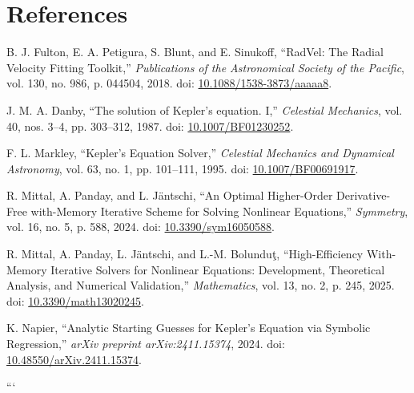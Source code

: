 \documentclass[11pt,a4paper]{article}
\newcommand{\dividerline}{\vspace{0.2em}{\color{Rule}\hrule height 0.5pt}\vspace{0.6em}}
\begin{document}
\vspace{1.4em}
\dividerline

\section*{References}
\begingroup
\small
\begin{enumerate}[label={[\arabic*]}, leftmargin=2.2em, itemsep=0.7em]

  \item B. J. Fulton, E. A. Petigura, S. Blunt, and E. Sinukoff,
  ``RadVel: The Radial Velocity Fitting Toolkit,''
  \textit{Publications of the Astronomical Society of the Pacific},
  vol. 130, no. 986, p. 044504, 2018.
  doi: \href{https://doi.org/10.1088/1538-3873/aaaaa8}
  {10.1088/1538-3873/aaaaa8}.

  \item J. M. A. Danby,
  ``The solution of Kepler's equation. I,''
  \textit{Celestial Mechanics},
  vol. 40, nos. 3--4, pp. 303--312, 1987.
  doi: \href{https://doi.org/10.1007/BF01230252}
  {10.1007/BF01230252}.

  \item F. L. Markley,
  ``Kepler's Equation Solver,''
  \textit{Celestial Mechanics and Dynamical Astronomy},
  vol. 63, no. 1, pp. 101--111, 1995.
  doi: \href{https://doi.org/10.1007/BF00691917}
  {10.1007/BF00691917}.

  \item R. Mittal, A. Panday, and L. J{\"a}ntschi,
  ``An Optimal Higher-Order Derivative-Free with-Memory Iterative Scheme
  for Solving Nonlinear Equations,''
  \textit{Symmetry},
  vol. 16, no. 5, p. 588, 2024.
  doi: \href{https://doi.org/10.3390/sym16050588}
  {10.3390/sym16050588}.

  \item R. Mittal, A. Panday, L. J{\"a}ntschi, and L.-M. Bolundu{\c{t}},
  ``High-Efficiency With-Memory Iterative Solvers for Nonlinear Equations:
  Development, Theoretical Analysis, and Numerical Validation,''
  \textit{Mathematics},
  vol. 13, no. 2, p. 245, 2025.
  doi: \href{https://doi.org/10.3390/math13020245}
  {10.3390/math13020245}.

  \item K. Napier,
  ``Analytic Starting Guesses for Kepler's Equation via Symbolic Regression,''
  \textit{arXiv preprint arXiv:2411.15374}, 2024.
  doi: \href{https://doi.org/10.48550/arXiv.2411.15374}
  {10.48550/arXiv.2411.15374}.

\end{enumerate}
\endgroup
```
\end{document}
